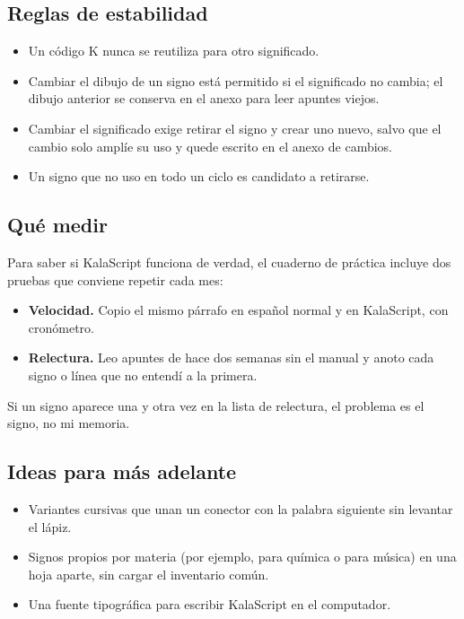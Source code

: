 \subsection{Reglas de estabilidad}
\begin{itemize}
\item Un código K nunca se reutiliza para otro significado.
\item Cambiar el dibujo de un signo está permitido si el significado no cambia;
 el dibujo anterior se conserva en el anexo para leer apuntes viejos.
\item Cambiar el significado exige retirar el signo y crear uno nuevo, salvo que
 el cambio solo amplíe su uso y quede escrito en el anexo de cambios.
\item Un signo que no uso en todo un ciclo es candidato a retirarse.
\end{itemize}

\subsection{Qué medir}
Para saber si KalaScript funciona de verdad, el cuaderno de práctica incluye
dos pruebas que conviene repetir cada mes:
\begin{itemize}
\item \textbf{Velocidad.} Copio el mismo párrafo en español normal y en
 KalaScript, con cronómetro.
\item \textbf{Relectura.} Leo apuntes de hace dos semanas sin el manual y anoto
 cada signo o línea que no entendí a la primera.
\end{itemize}
Si un signo aparece una y otra vez en la lista de relectura, el problema es el
signo, no mi memoria.

\subsection{Ideas para más adelante}
\begin{itemize}
\item Variantes cursivas que unan un conector con la palabra siguiente sin
 levantar el lápiz.
\item Signos propios por materia (por ejemplo, para química o para música) en
 una hoja aparte, sin cargar el inventario común.
\item Una fuente tipográfica para escribir KalaScript en el computador.
\end{itemize}

